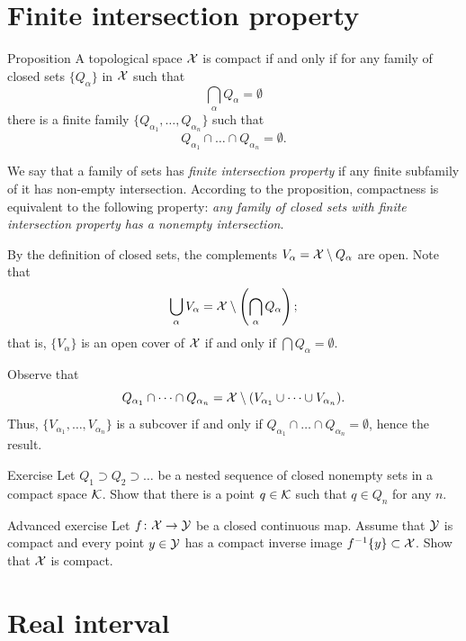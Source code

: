 \section{Finite intersection property} 

\begin{thm}{Proposition}\label{prop:finite intersection property}
A topological space $\mathcal{X}$ is compact if and only if for any family of closed sets $\{Q_\alpha\}$ in $\mathcal{X}$ such that
\[\bigcap_{\alpha}Q_\alpha=\emptyset\]
there is a finite family $\{Q_{\alpha_1},\ldots,Q_{\alpha_n}\}$
such that
\[Q_{\alpha_1}\cap\dots\cap Q_{\alpha_n}=\emptyset.\]

\end{thm}

We say that a family of sets has \emph{finite intersection property} if any finite subfamily of it has non-empty intersection.
According to the proposition, compactness is equivalent to the following property: \textit{any family of closed sets with finite intersection property has a nonempty intersection}.

By the definition of closed sets, the complements $V_\alpha=\mathcal{X}\setminus Q_\alpha$ are open.
Note that 
\[\bigcup_\alpha V_\alpha=\mathcal{X}\setminus \left(\bigcap_{\alpha}Q_\alpha\right);\]
that is, $\{V_\alpha\}$ is an open cover of $\mathcal{X}$ if and only if $\bigcap Q_\alpha=\emptyset$.


Observe that
\[Q_{\alpha_1}\cap\dots\cap Q_{\alpha_n}=\mathcal{X}\setminus(V_{\alpha_1}\cup\dots\cup V_{\alpha_n}).
\]
Thus, $\{V_{\alpha_1},\ldots,V_{\alpha_n}\}$ is a subcover if and only if
 $Q_{\alpha_1}\cap\dots\cap Q_{\alpha_n}=\emptyset$, hence the result.
\qeds

\begin{thm}{Exercise}\label{ex:nested-compact}
Let $Q_1\supset Q_2\supset\dots$ be a nested sequence of closed nonempty sets in a compact space $\mathcal{K}$.
Show that there is a point $q\in \mathcal{K}$ such that $q\in Q_n$ for any $n$.
\end{thm}

\begin{thm}{Advanced exercise}\label{ex:proper-point}
Let $f\colon\mathcal{X}\to\mathcal{Y}$ be a closed continuous map.
Assume that $\mathcal{Y}$ is compact and every point $y\in \mathcal{Y}$ has a compact inverse image $f^{-1}\{y\}\subset \mathcal{X}$.
Show that $\mathcal{X}$ is compact.
\end{thm}

\section{Real interval}\label{sec:compact-interval}

